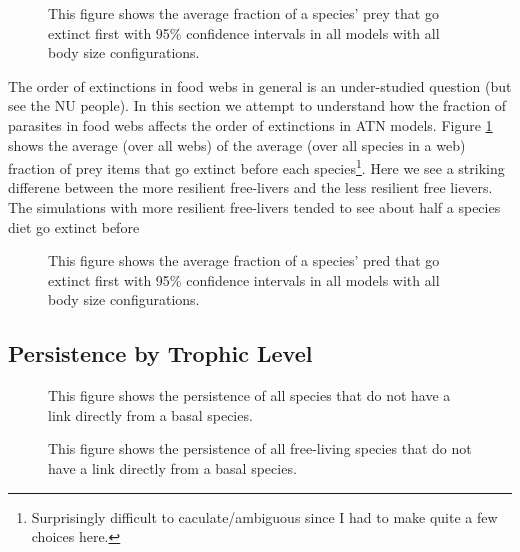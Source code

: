 \documentclass[11pt]{amsart}
\begin{document}
\begin{figure}[h]
\caption{This figure shows the average fraction of a species' prey that go extinct first with 95\% confidence intervals in all models with all body size configurations. \label{fig:frac-prey-first}}
\end{figure}
The order of extinctions in food webs in general is an under-studied question (but see the NU people).  In this section we attempt to understand how the fraction of parasites in food webs affects the order of extinctions in ATN models.  Figure \ref{fig:frac-prey-first} shows the average (over all webs) of the average (over all species in a web) fraction of prey items that go extinct before each species\footnote{Surprisingly difficult to caculate/ambiguous since I had to make quite a few choices here.}.  Here we see a striking differene between the more resilient free-livers and the less resilient free lievers.  The simulations with more resilient free-livers tended to see about half a species diet go extinct before
 
\begin{figure}[h]
\caption{This figure shows the average fraction of a species' pred that go extinct first with 95\% confidence intervals in all models with all body size configurations.\label{fig:frac-pred-first}}
\end{figure}

\subsection{Persistence by Trophic Level}

\begin{figure}[h]
\caption{This figure shows the persistence of all species that do not have a link directly from a basal species. \label{fig:tl3-all}}
\end{figure}

\begin{figure}[h]
\caption{This figure shows the persistence of all free-living species that do not have a link directly from a basal species.\label{tl3-free}}
\end{figure}
\end{document}
